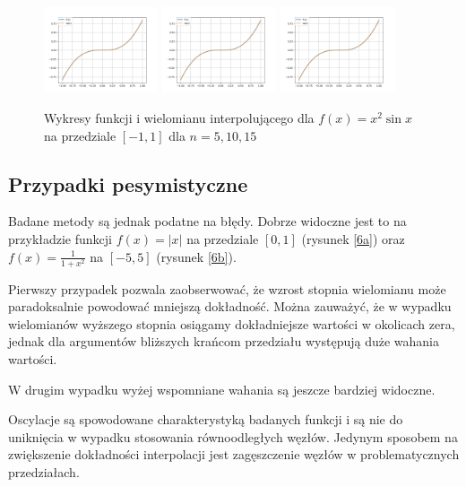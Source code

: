 \documentclass{article}
\begin{document}
\begin{figure}
\includegraphics[width=0.3\textwidth]{plots/5b_5.png}
\includegraphics[width=0.3\textwidth]{plots/5b_10.png}
\includegraphics[width=0.3\textwidth]{plots/5b_15.png}
\caption{Wykresy funkcji i wielomianu interpolującego dla $f(x) = x^2\sin x$ na przedziale $[-1,1]$ dla $n=5,10,15$}
\label{5b}
\end{figure}

\subsection{Przypadki pesymistyczne}

Badane metody są jednak podatne na błędy.
Dobrze widoczne jest to na przykładzie funkcji $f(x)=|x|$ na przedziale $[0,1]$ (rysunek \ref{6a}) oraz $f(x) = \frac{1}{1+x^2}$ na $[-5,5]$ (rysunek \ref{6b}).

Pierwszy przypadek pozwala zaobserwować, że wzrost stopnia wielomianu może paradoksalnie powodować mniejszą dokładność.
Można zauważyć, że w wypadku wielomianów wyższego stopnia osiągamy dokładniejsze wartości w okolicach zera, jednak dla argumentów bliższych krańcom przedziału występują duże wahania wartości.

W drugim wypadku wyżej wspomniane wahania są jeszcze bardziej widoczne.

Oscylacje są spowodowane charakterystyką badanych funkcji i są nie do uniknięcia w wypadku stosowania równoodległych węzłów.
Jedynym sposobem na zwiększenie dokładności interpolacji jest zagęszczenie węzłów w problematycznych przedziałach.
\end{document}
